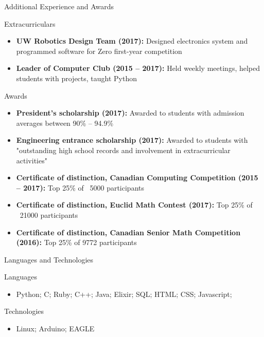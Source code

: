 \documentclass[calibri]{mcdowellcv}
\begin{document}
    \begin{cvsection}{Additional Experience and Awards}
        \begin{cvsubsection}{Extracurriculars}{}{}
            \begin{itemize}
                \item \textbf{UW Robotics Design Team (2017):} Designed electronics system and programmed software for Zero first-year competition
                \item \textbf{Leader of Computer Club (2015 -- 2017):} Held weekly meetings, helped students with projects, taught Python
            \end{itemize}
        \end{cvsubsection}
        \begin{cvsubsection}{Awards}{}{}
            \begin{itemize}
                \item \textbf{President's scholarship (2017):} Awarded to students with admission averages between 90\% -- 94.9\%
                \item \textbf{Engineering entrance scholarship (2017):} Awarded to students with "outstanding high school records and involvement in extracurricular activities"
                \item \textbf{Certificate of distinction, Canadian Computing Competition (2015 -- 2017):} Top 25\% of ~5000 participants
                \item \textbf{Certificate of distinction, Euclid Math Contest (2017):} Top 25\% of ~21000 participants
                \item \textbf{Certificate of distinction, Canadian Senior Math Competition (2016):} Top 25\% of 9772 participants
            \end{itemize}
        \end{cvsubsection}
    \end{cvsection}

    \begin{cvsection}{Languages and Technologies}
        \begin{cvsubsection}{Languages}{}{}
            \begin{itemize}
                \item Python; C; Ruby; C++; Java; Elixir; SQL; HTML; CSS; Javascript;
            \end{itemize}
        \end{cvsubsection}
        \begin{cvsubsection}{Technologies}{}{}
            \begin{itemize}
                \item Linux; Arduino; EAGLE
            \end{itemize}
        \end{cvsubsection}
    \end{cvsection}
\end{document}
